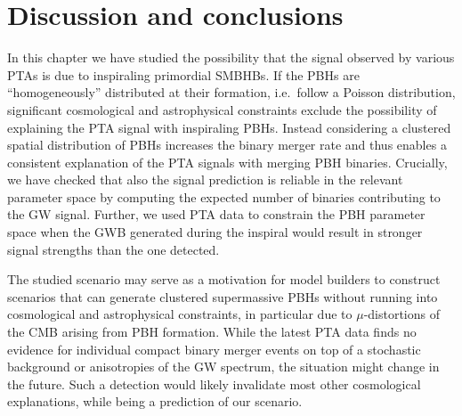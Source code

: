 \section{Discussion and conclusions}
In this chapter we have studied the possibility that the signal observed by various \acp{PTA} is due to inspiraling primordial \acp{SMBHB}. If the \acp{PBH} are ``homogeneously'' distributed at their formation, i.e.~follow a Poisson distribution, significant cosmological and astrophysical constraints exclude the possibility of explaining the PTA signal with inspiraling \acp{PBH}. Instead considering a clustered spatial distribution of \acp{PBH} increases the binary merger rate and thus enables a  consistent explanation of the \ac{PTA} signals with merging \ac{PBH} binaries. Crucially, we have checked that also the signal prediction is reliable in the relevant parameter space by computing the expected number of binaries contributing to the \ac{GW} signal. Further, we used \ac{PTA} data to constrain the \ac{PBH} parameter space when the \ac{GWB} generated during the inspiral would result in stronger signal strengths than the one detected.

The studied scenario may serve as a motivation for model builders to construct scenarios that can generate clustered supermassive \acp{PBH} without running into cosmological and astrophysical constraints, in particular due to $\mu$-distortions of the \ac{CMB} arising from \ac{PBH} formation. While the latest \ac{PTA} data finds no evidence for individual compact binary merger events on top of a stochastic background or anisotropies of the \ac{GW} spectrum, the situation might change in the future. Such a detection would likely invalidate most other cosmological explanations, while being a prediction of our scenario.

